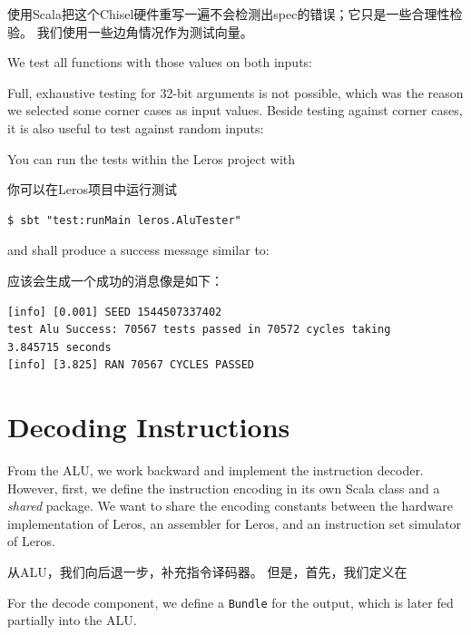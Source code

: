 \documentclass[%
    10pt,
    headinclude, footexclude,
    openright, %
    notitlepage,
    cleardoubleempty,
    headsepline,
    pointlessnumbers,
    bibtotoc, idxtotoc,
    ]{scrbook}
\newcommand{\code}[1]{{\small{\texttt{#1}}}}
\newcommand{\todo}[1]{{\emph{TODO: #1}}}
\renewcommand{\todo}[1]{}
\begin{document}
{\noindent 使用Scala把这个Chisel硬件重写一遍不会检测出spec的错误；它只是一些合理性检验。
我们使用一些边角情况作为测试向量。


\noindent We test all functions with those values on both inputs:
\noindent 


\noindent Full, exhaustive testing for 32-bit arguments is not possible, which was the reason we
selected some corner cases as input values. Beside testing against corner cases, it is also useful
to test against random inputs:


\noindent You can run the tests within the Leros project with

\noindent 你可以在Leros项目中运行测试

\begin{verbatim}
$ sbt "test:runMain leros.AluTester"
\end{verbatim}

and shall produce a success message similar to:

应该会生成一个成功的消息像是如下：

\begin{verbatim}
[info] [0.001] SEED 1544507337402
test Alu Success: 70567 tests passed in 70572 cycles taking
3.845715 seconds
[info] [3.825] RAN 70567 CYCLES PASSED
\end{verbatim}

\section{Decoding Instructions}

From the ALU, we work backward and implement the instruction decoder.
However, first, we define the instruction encoding in its own Scala class and
a \emph{shared} package. We want to share the encoding constants between
the hardware implementation of Leros, an assembler for Leros, and an instruction
set simulator of Leros.

从ALU，我们向后退一步，补充指令译码器。
但是，首先，我们定义在


\todo{Update code when Leros is more complete, as stuff is missing.}

\noindent For the decode component, we define a \code{Bundle} for the output,
which is later fed partially into the ALU.

}
\end{document}
